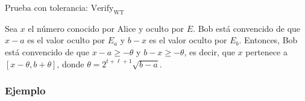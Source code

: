 \begin{minipage}{0.9\textwidth}
    \begin{algorithm}[H] \label{alg:verify wt}
        \caption{Prueba con tolerancia: $\operatorname{Verify_{WT}}$}
    \end{algorithm}
\end{minipage}

 Sea $x$ el número conocido por Alice y oculto por $E$. Bob está convencido de que $x - a$ es el valor oculto por $E_{a}$ y $b - x$ es el valor oculto por $E_{b}$. Entonces, Bob está convencido de que $x - a \geq -\theta$ y $b - x \geq -\theta$, es decir, que $x$ pertenece a $[x-\theta, b+\theta]$, donde $\theta = 2^{t + \ell + 1}\sqrt{b - a}$.

\subsubsection{Ejemplo}

